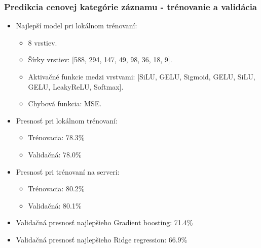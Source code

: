 \documentclass[slovak,10pt]{beamer}
\begin{document}
\begin{frame}
	\frametitle{Predikcia cenovej kategórie záznamu - trénovanie a validácia}
	\begin{itemize}
		\item<1> Najlepší model pri lokálnom trénovaní:
		\begin{itemize}
			\item<1> 8 vrstiev.
			\item<1> Šírky vrstiev: [588, 294, 147, 49, 98, 36, 18, 9].
			\item<1> Aktivačné funkcie medzi vrstvami: [SiLU, GELU, Sigmoid, GELU, SiLU, GELU, LeakyReLU, Softmax].
			\item<1> Chybová funkcia: MSE.
		\end{itemize}
		
		\item<1> Presnosť pri lokálnom trénovaní: 
		\begin{itemize}
			\item<1> Trénovacia: 78.3\%
			\item<1> Validačná: 78.0\%
		\end{itemize}
		\item<1> Presnosť pri trénovaní na serveri: 
		\begin{itemize}
			\item<1> Trénovacia: 80.2\%
			\item<1> Validačná: 80.1\%
		\end{itemize}
		\item<1> Validačná presnosť najlepšieho Gradient boosting: 71.4\%
		\item<1> Validačná presnosť najlepšieho Ridge regression: 66.9\%
	\end{itemize}
	
\end{frame}
\end{document}
